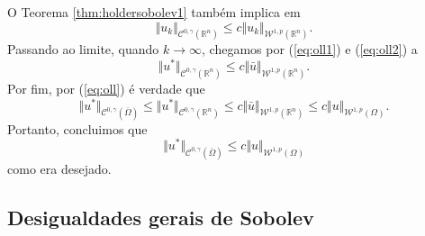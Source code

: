 \documentclass[a4paper, 11pt]{book}
\theoremstyle{definition}
\newcommand{\bR}{\mathbb{R}}
\newcommand{\cC}{\mathcal{C}}
\newcommand{\cW}{\mathcal{W}}
\begin{document}
\begin{prf}
    O Teorema \ref{thm:holdersobolev1} também implica em
    \[
        \Vert u_k \Vert_{\cC^{0,\gamma}(\bR^n)} \leqslant c \Vert u_k \Vert_{\cW^{1,p}(\bR^n)}.
    \]
    Passando ao limite, quando $k \to \infty$, chegamos por (\ref{eq:oll1}) e (\ref{eq:oll2}) a
    \[
        \Vert u^* \Vert_{\cC^{0,\gamma}(\bR^n)} \leqslant c \Vert \bar u \Vert_{\cW^{1,p}(\bR^n)}.
    \]
    Por fim, por (\ref{eq:oll}) é verdade que
    \[
        \Vert u^* \Vert_{\cC^{0,\gamma}(\overline \Omega)} \leqslant \Vert u^* \Vert_{\cC^{0,\gamma}(\bR^n)} \leqslant c \Vert \bar u \Vert_{\cW^{1,p}(\bR^n)} \leqslant c \Vert u \Vert_{\cW^{1,p}(\Omega)}.
    \]
    Portanto, concluimos que
    \[
        \Vert u^* \Vert_{\cC^{0,\gamma}(\overline\Omega)} \leqslant c \Vert u \Vert_{\cW^{1,p}(\Omega)}
    \]
    como era desejado.
\end{prf}

\subsection{Desigualdades gerais de Sobolev}
\end{document}
